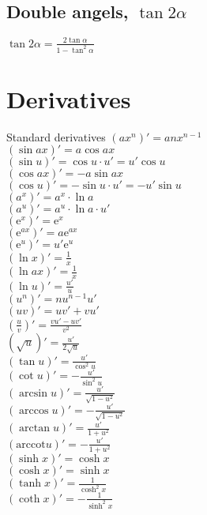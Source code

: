 \documentclass[a4paper, 10pt]{scrartcl}
\newcommand*\euler{\mathrm{e}}
\newcommand*\arccot{\mathrm{arccot}}
\begin{document}
\subsection{Double angels, $\tan{2\alpha}$}
$\tan{2\alpha} = \frac{2\tan{\alpha}}{1 - \tan^{2}{\alpha}}$\\

\section{Derivatives}

Standard derivatives
$(ax^{n})' = anx^{n-1}$\\
$(\sin{ax})' = a\cos{ax}$\\
$(\sin{u})' = \cos{u}\cdot u' = u'\cos{u}$\\
$(\cos{ax})' = -a\sin{ax}$\\
$(\cos{u})' = -\sin{u}\cdot u' = -u'\sin{u}$\\
$(a^{x})' = a^{x}\cdot\ln{a}$\\
$(a^{u})' = a^{u}\cdot\ln{a}\cdot u'$\\
$(\euler^{x})' = \euler^{x}$\\
$(\euler^{ax})' = a\euler^{ax}$\\
$(\euler^{u})' = u'\euler^{u}$\\
$(\ln{x})' = \frac{1}{x}$\\
$(\ln{ax})' = \frac{1}{x}$\\
$(\ln{u})' = \frac{u'}{u}$\\
$(u^{n})' = nu^{n-1}u'$\\
$(uv)' = uv' + vu'$\\
$\left(\frac{u}{v}\right)' = \frac{vu' - uv'}{v^{2}}$\\
$\left(\sqrt{u}\right)' = \frac{u'}{2\sqrt{u}}$\\
$(\tan{u})' = \frac{u'}{\cos^{2}{u}}$\\
$(\cot{u})' = -\frac{u'}{\sin^{2}{u}}$\\
$(\arcsin{u})' = \frac{u'}{\sqrt{1 - u^{2}}}$\\
$(\arccos{u})' = -\frac{u'}{\sqrt{1 - u^{2}}}$\\
$(\arctan{u})' = \frac{u'}{1 + u^{2}}$\\
$(\arccot{u})' = -\frac{u'}{1 + u^{2}}$\\
$(\sinh{x})' = \cosh{x}$\\
$(\cosh{x})' = \sinh{x}$\\
$(\tanh{x})' = \frac{1}{\cosh^{2}{x}}$\\
$(\coth{x})' = -\frac{1}{\sinh^{2}{x}}$\\
\end{document}
